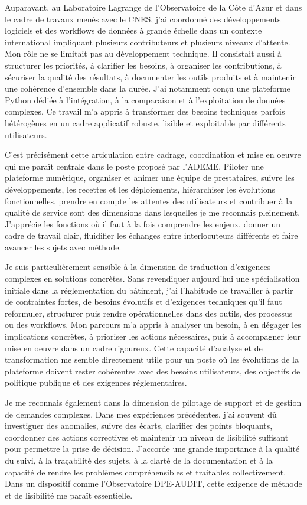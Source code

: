 \documentclass[11pt,a4paper]{altacv}
\begin{document}
{Auparavant, au Laboratoire Lagrange de l'Observatoire de la Côte d'Azur et dans le cadre de travaux menés avec le CNES, j'ai coordonné des développements logiciels et des workflows de données à grande échelle dans un contexte international impliquant plusieurs contributeurs et plusieurs niveaux d'attente. Mon rôle ne se limitait pas au développement technique. Il consistait aussi à structurer les priorités, à clarifier les besoins, à organiser les contributions, à sécuriser la qualité des résultats, à documenter les outils produits et à maintenir une cohérence d'ensemble dans la durée. J'ai notamment conçu une plateforme Python dédiée à l'intégration, à la comparaison et à l'exploitation de données complexes. Ce travail m'a appris à transformer des besoins techniques parfois hétérogènes en un cadre applicatif robuste, lisible et exploitable par différents utilisateurs.

C'est précisément cette articulation entre cadrage, coordination et mise en oeuvre qui me paraît centrale dans le poste proposé par l'ADEME. Piloter une plateforme numérique, organiser et animer une équipe de prestataires, suivre les développements, les recettes et les déploiements, hiérarchiser les évolutions fonctionnelles, prendre en compte les attentes des utilisateurs et contribuer à la qualité de service sont des dimensions dans lesquelles je me reconnais pleinement. J'apprécie les fonctions où il faut à la fois comprendre les enjeux, donner un cadre de travail clair, fluidifier les échanges entre interlocuteurs différents et faire avancer les sujets avec méthode.

Je suis particulièrement sensible à la dimension de traduction d'exigences complexes en solutions concrètes. Sans revendiquer aujourd'hui une spécialisation initiale dans la réglementation du bâtiment, j'ai l'habitude de travailler à partir de contraintes fortes, de besoins évolutifs et d'exigences techniques qu'il faut reformuler, structurer puis rendre opérationnelles dans des outils, des processus ou des workflows. Mon parcours m'a appris à analyser un besoin, à en dégager les implications concrètes, à prioriser les actions nécessaires, puis à accompagner leur mise en oeuvre dans un cadre rigoureux. Cette capacité d'analyse et de transformation me semble directement utile pour un poste où les évolutions de la plateforme doivent rester cohérentes avec des besoins utilisateurs, des objectifs de politique publique et des exigences réglementaires.

Je me reconnais également dans la dimension de pilotage de support et de gestion de demandes complexes. Dans mes expériences précédentes, j'ai souvent dû investiguer des anomalies, suivre des écarts, clarifier des points bloquants, coordonner des actions correctives et maintenir un niveau de lisibilité suffisant pour permettre la prise de décision. J'accorde une grande importance à la qualité du suivi, à la traçabilité des sujets, à la clarté de la documentation et à la capacité de rendre les problèmes compréhensibles et traitables collectivement. Dans un dispositif comme l'Observatoire DPE-AUDIT, cette exigence de méthode et de lisibilité me paraît essentielle.

}
\end{document}
